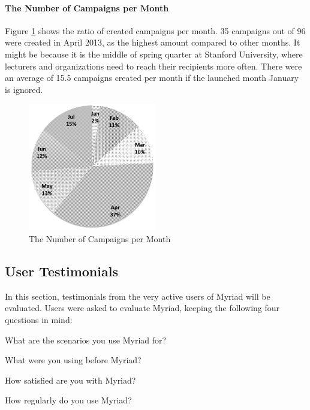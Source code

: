 \paragraph{The Number of Campaigns per Month} Figure \ref{fig:ChartCampaignsMonths} shows the ratio of created campaigns per month. 35 campaigns out of 96 were created in April 2013, as the highest amount compared to other months. It might be because it is the middle of spring quarter at Stanford University, where lecturers and organizations need to reach their recipients more often. There were an average of 15.5 campaigns created per month if the launched month January is ignored.

\begin{figure}[htbp]
	\centering
	\includegraphics[width=0.50\textwidth]{imgs/ChartCampaignsMonths.png}
	\caption[The Number of Campaigns per Month]{The Number of Campaigns per Month}
	\label{fig:ChartCampaignsMonths}
\end{figure}

\subsection{User Testimonials}
\label{subsec:5.4.2:UserTest}

In this section, testimonials from the very active users of Myriad will be evaluated. Users were asked to evaluate Myriad, keeping the following four questions in mind:

\begin{compactenum}
	\item What are the scenarios you use Myriad for?
	\item What were you using before Myriad?
	\item How satisfied are you with Myriad?
	\item How regularly do you use Myriad?
\end{compactenum}

